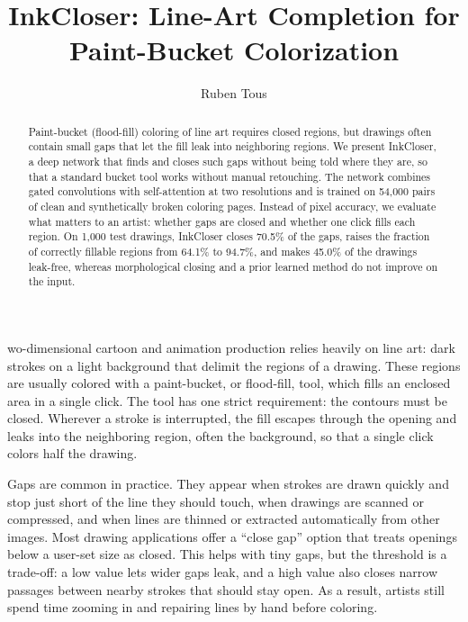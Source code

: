 \documentclass{IEEEcsmag}
\begin{document}

\title{InkCloser: Line-Art Completion for Paint-Bucket Colorization}

\author{Ruben Tous}


\begin{abstract}
Paint-bucket (flood-fill) coloring of line art requires closed regions, but drawings
often contain small gaps that let the fill leak into neighboring regions. We present
InkCloser, a deep network that finds and closes such gaps without being told where
they are, so that a standard bucket tool works without manual retouching. The
network combines gated convolutions with self-attention at two resolutions and is trained on 54,000 pairs of clean and synthetically broken coloring pages. Instead of pixel accuracy, we evaluate what matters
to an artist: whether gaps are closed and whether one click fills each region. On
1,000 test drawings, InkCloser closes 70.5\% of the gaps, raises the fraction of
correctly fillable regions from 64.1\% to 94.7\%, and makes 45.0\% of the drawings
leak-free, whereas morphological closing and a prior learned method do not improve on the input.
\end{abstract}

\maketitle

wo-dimensional cartoon and animation production relies heavily on line
art: dark strokes on a light background that delimit the regions of a drawing. These
regions are usually colored with a paint-bucket, or flood-fill, tool, which fills an
enclosed area in a single click. The tool has one strict requirement: the contours
must be closed. Wherever a stroke is interrupted, the fill escapes through the
opening and leaks into the neighboring region, often the background, so that a
single click colors half the drawing.

Gaps are common in practice. They appear when strokes are drawn quickly and stop
just short of the line they should touch, when drawings are scanned or compressed,
and when lines are thinned or extracted automatically from other images. Most
drawing applications offer a ``close gap'' option that treats openings below a
user-set size as closed. This helps with tiny gaps, but the threshold is a
trade-off: a low value lets wider gaps leak, and a high value also closes narrow
passages between nearby strokes that should stay open. As a result, artists still
spend time zooming in and repairing lines by hand before coloring.
\end{document}
